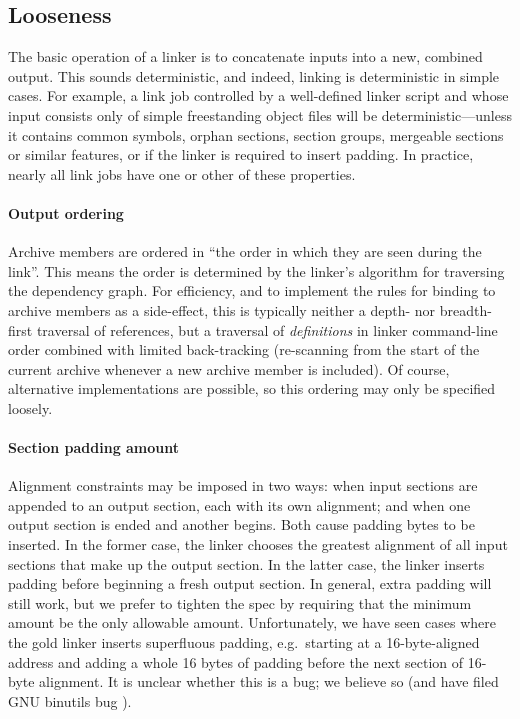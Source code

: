 
\subsection{Looseness}

The basic operation of a linker is to concatenate inputs 
into a new, combined output. 
This sounds deterministic, and indeed, linking is deterministic in simple cases.
For example, a link job controlled by a well-defined linker script
and whose input consists only of simple freestanding object files
will be deterministic---unless it contains common symbols, 
orphan sections, section groups, mergeable sections or similar features,
or if the linker is required to insert padding.
In practice, nearly all link jobs have one or other of these properties.

\paragraph{Output ordering}
Archive members are ordered in ``the order in which they are seen during the link''.
This means the order is determined by the linker's algorithm for
traversing the dependency graph. 
For efficiency, 
and to implement the rules for binding to archive members as a side-effect, 
this is typically neither a depth- nor breadth-first traversal of references,
but a traversal of \emph{definitions} in linker command-line order
combined with limited back-tracking 
(re-scanning from the start of the current archive whenever a new archive
member is included).
Of course, alternative implementations are possible, 
so this ordering may only be specified loosely.

\paragraph{Section padding amount}
Alignment constraints may be imposed 
in two ways: when input sections are appended to an output section, 
each with its own alignment; 
and when one output section is ended and another begins.
Both cause padding bytes to be inserted. 
In the former case, the linker chooses the greatest alignment of all input sections
that make up the output section.
In the latter case, the linker inserts padding before beginning a fresh output section.
In general, extra padding will still work, but 
we prefer to tighten the spec 
by requiring that the minimum amount be the only allowable amount.
Unfortunately, we have seen cases where the \textsf{gold} linker inserts
superfluous padding, e.g.\ starting at a 16-byte-aligned address
and adding a whole 16 bytes of padding
before the next section of 16-byte alignment.
It is unclear whether this is a bug; 
we believe so (and have filed GNU binutils bug ).

